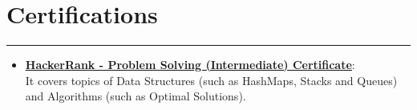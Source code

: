 \documentclass[a4paper,10pt]{article}
\begin{document}
\section*{Certifications}
\vspace{-.2em}
\hrule
\vspace{0.5em}
\begin{itemize}
    \item \textbf{\href{https://www.hackerrank.com/certificates/0546eb7d14c4}{\underline{HackerRank - Problem Solving (Intermediate) Certificate}}}:\\ It covers topics of Data Structures (such as HashMaps, Stacks and Queues) and Algorithms (such as Optimal Solutions).
\end{itemize}
\end{document}
